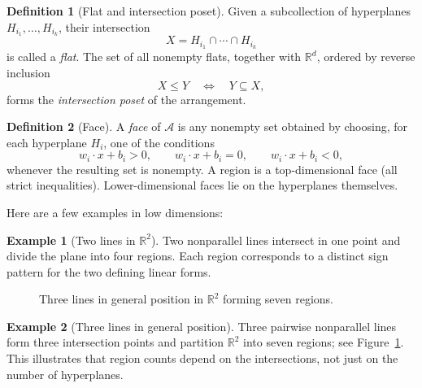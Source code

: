 \documentclass[12pt]{amsart}
\theoremstyle{plain}
\theoremstyle{definition}
\newtheorem{definition}{Definition}[section]
\newtheorem{example}{Example}[section]
\theoremstyle{remark}
\newcommand{\R}{\mathbb{R}}
\newcommand{\A}{\mathcal{A}}
\begin{document}
\begin{definition}[Flat and intersection poset]
Given a subcollection of hyperplanes $H_{i_1}, \dots, H_{i_k}$, their intersection
\[
X = H_{i_1} \cap \cdots \cap H_{i_k}
\]
is called a \emph{flat}.  
The set of all nonempty flats, together with $\R^d$, ordered by reverse inclusion
\[
X \le Y \quad \iff \quad Y \subseteq X,
\]
forms the \emph{intersection poset} of the arrangement.
\end{definition}

\begin{definition}[Face]
A \emph{face} of $\A$ is any nonempty set obtained by choosing, for each hyperplane $H_i$, one of the conditions
\[
w_i \cdot x + b_i > 0, \qquad
w_i \cdot x + b_i = 0, \qquad
w_i \cdot x + b_i < 0,
\]
whenever the resulting set is nonempty.  
A region is a top-dimensional face (all strict inequalities).
Lower-dimensional faces lie on the hyperplanes themselves.
\end{definition}

Here are a few examples in low dimensions:

\begin{example}[Two lines in $\R^2$]
Two nonparallel lines intersect in one point and divide the plane into four regions. Each region corresponds to a distinct sign pattern for the two defining linear forms.
\end{example}

\begin{figure}[h]
\centering
{}
\caption{Three lines in general position in $\mathbb R^2$ forming seven regions.}
\label{fig:three-lines}
\end{figure}

\begin{example}[Three lines in general position]
Three pairwise nonparallel lines form three intersection points and partition $\R^2$ into seven regions; see Figure~\ref{fig:three-lines}.  
This illustrates that region counts depend on the intersections, not just on the number of hyperplanes.
\end{example}
\end{document}
